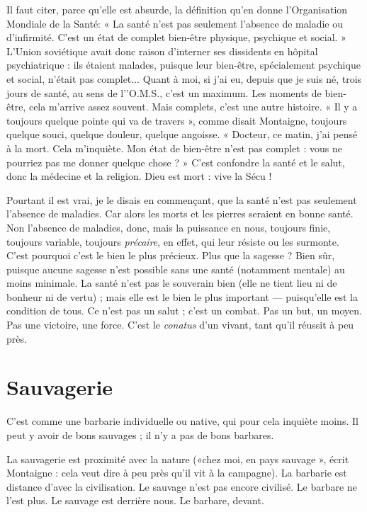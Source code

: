 Il faut citer, parce qu’elle est absurde, la définition qu’en donne l'Organisation
Mondiale de la Santé: « La santé n’est pas seulement l'absence de
maladie ou d’infirmité. C’est un état de complet bien-être physique, psychique
et social. » L'Union soviétique avait donc raison d’interner ses dissidents en
hôpital psychiatrique : ils étaient malades, puisque leur bien-être, spécialement
psychique et social, n’était pas complet... Quant à moi, si j'ai eu, depuis que je
suis né, trois jours de santé, au sens de l’'O.M.S., c’est un maximum. Les
moments de bien-être, cela m'arrive assez souvent. Mais complets, c’est une
autre histoire. « Il y a toujours quelque pointe qui va de travers », comme disait
Montaigne, toujours quelque souci, quelque douleur, quelque angoisse.
« Docteur, ce matin, j'ai pensé à la mort. Cela m'inquiète. Mon état de bien-être
n’est pas complet : vous ne pourriez pas me donner quelque chose ? » C’est
confondre la santé et le salut, donc la médecine et la religion. Dieu est mort :
vive la Sécu !

Pourtant il est vrai, je le disais en commençant, que la santé n’est pas seulement
l’absence de maladies. Car alors les morts et les pierres seraient en
bonne santé. Non l’absence de maladies, donc, mais la puissance en nous, toujours
finie, toujours variable, toujours {\it précaire}, en effet, qui leur résiste ou les
surmonte. C’est pourquoi c’est le bien le plus précieux. Plus que la sagesse ?
Bien sûr, puisque aucune sagesse n’est possible sans une santé (notamment
mentale) au moins minimale. La santé n’est pas le souverain bien (elle ne tient
lieu ni de bonheur ni de vertu) ; mais elle est le bien le plus important —
puisqu'elle est la condition de tous. Ce n’est pas un salut ; c’est un combat. Pas
un but, un moyen. Pas une victoire, une force. C’est le {\it conatus} d’un vivant, tant
qu’il réussit à peu près.

\section{Sauvagerie}
C’est comme une barbarie individuelle ou native, qui pour
cela inquiète moins. Il peut y avoir de bons sauvages ; il n’y
a pas de bons barbares.

La sauvagerie est proximité avec la nature («chez moi, en pays sauvage »,
écrit Montaigne : cela veut dire à peu près qu’il vit à la campagne). La barbarie
est distance d’avec la civilisation. Le sauvage n’est pas encore civilisé. Le barbare
ne l’est plus. Le sauvage est derrière nous. Le barbare, devant.

